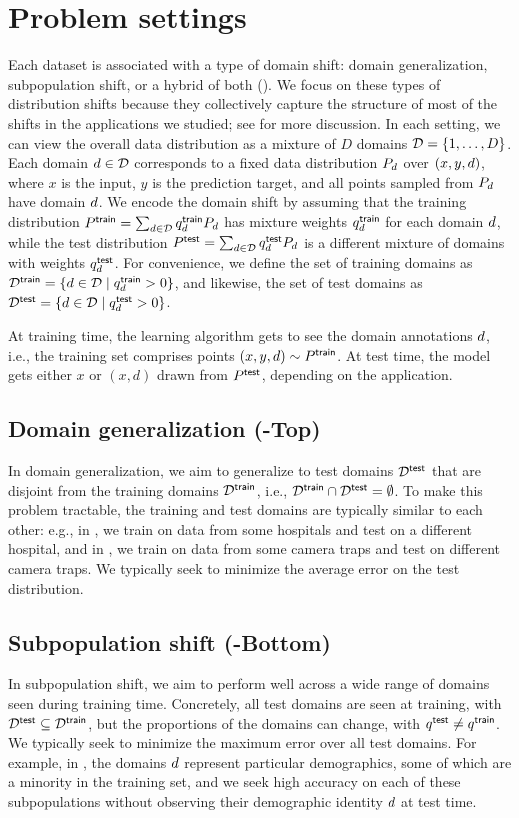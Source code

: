 \section{Problem settings}\label{sec:problems}
Each \Wilds dataset is associated with a type of domain shift: domain generalization, subpopulation shift, or a hybrid of both ().
We focus on these types of distribution shifts because they collectively capture the structure of most of the shifts in the applications we studied; see  for more discussion. 
In each setting, we can view the overall data distribution as a mixture of $D$ domains $\mathcal{D} = \{1,\dots,D\}$.
Each domain $d\in\mathcal{D}$ corresponds to a fixed data distribution $P_d$ over $(x, y, d)$, where $x$ is the input, $y$ is the prediction target, and all points sampled from $P_d$ have domain $d$.
We encode the domain shift by assuming that the training distribution $P^\mathsf{train} = \sum_{d\in\mathcal{D}} q_d^\mathsf{train}P_d$ has mixture weights $q_d^\mathsf{train}$ for each domain $d$,
while the test distribution $P^\mathsf{test} = \sum_{d\in\mathcal{D}} q_d^\mathsf{test}P_d$ is a different mixture of domains with weights $q_d^\mathsf{test}$.
For convenience, we define the set of training domains as $\mathcal{D}^\mathsf{train} = \{d\in\mathcal{D} \mid q_d^\mathsf{train} > 0\}$, and likewise, the set of test domains as $\mathcal{D}^\mathsf{test}=\{d\in\mathcal{D} \mid q_d^\mathsf{test} > 0\}$.

At training time, the learning algorithm gets to see the domain annotations $d$, i.e., the training set comprises points $(x, y, d) \sim P^\mathsf{train}$.
At test time, the model gets either $x$ or $(x,d)$ drawn from $P^\mathsf{test}$, depending on the application.

\subsection{Domain generalization (-Top)}
In domain generalization, we aim to generalize to test domains $\mathcal{D}^\mathsf{test}$ that are disjoint from the training domains $\mathcal{D}^\mathsf{train}$, i.e., $\mathcal{D}^\mathsf{train} \cap \mathcal{D}^\mathsf{test}=\emptyset$.
To make this problem tractable, the training and test domains are typically similar to each other: e.g., in \Camelyon, we train on data from some hospitals and test on a different hospital, and in \iWildCam, we train on data from some camera traps and test on different camera traps.
We typically seek to minimize the average error on the test distribution.

\subsection{Subpopulation shift (-Bottom)}
In subpopulation shift, we aim to perform well across a wide range of domains seen during training time.
Concretely, all test domains are seen at training, with $\mathcal{D}^\mathsf{test}\subseteq\mathcal{D}^\mathsf{train}$, but the proportions of the domains can change, with $q^\mathsf{test}\neq q^\mathsf{train}$.
We typically seek to minimize the maximum error over all test domains.
For example, in \CivilComments, the domains $d$ represent particular demographics, some of which are a minority in the training set, and we seek high accuracy on each of these subpopulations without observing their demographic identity $d$ at test time.

